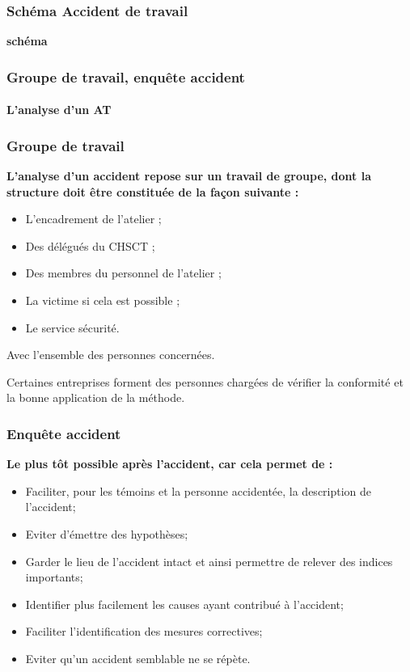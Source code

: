 \documentclass{beamer}
\begin{document}
\begin{frame}
\frametitle{Schéma Accident de travail}

\textbf{schéma}
\end{frame}

\begin{frame}
\frametitle{Groupe de travail, enquête accident}
\framesubtitle{L’analyse d'un AT}

\end{frame}

\begin{frame}
\frametitle{Groupe de travail}

\textbf{L'analyse d'un accident repose sur un travail de groupe, dont la structure doit être constituée de la façon suivante :}
\begin{itemize}
\item  L'encadrement de l'atelier ;
\item Des délégués du CHSCT ; 
\item Des membres du personnel de l'atelier ; 
\item La victime si cela est possible ; 
\item Le service sécurité.
\end{itemize} 

Avec l’ensemble des personnes concernées.

Certaines entreprises forment des personnes chargées de vérifier la conformité et la bonne application de la méthode.
\end{frame}

\begin{frame}
\frametitle{Enquête accident}

\textbf{Le plus tôt possible après l’accident, car cela permet de :}
\begin{itemize}
\item Faciliter, pour les témoins et la personne accidentée, la description de l’accident;

\item Eviter d’émettre des hypothèses;

\item Garder le lieu de l’accident intact et ainsi permettre de relever des indices importants;

\item Identifier plus facilement les causes ayant contribué à l’accident;

\item Faciliter l’identification des mesures correctives;

\item Eviter qu’un accident semblable ne se répète.
\end{itemize} 
\end{frame}
\end{document}
